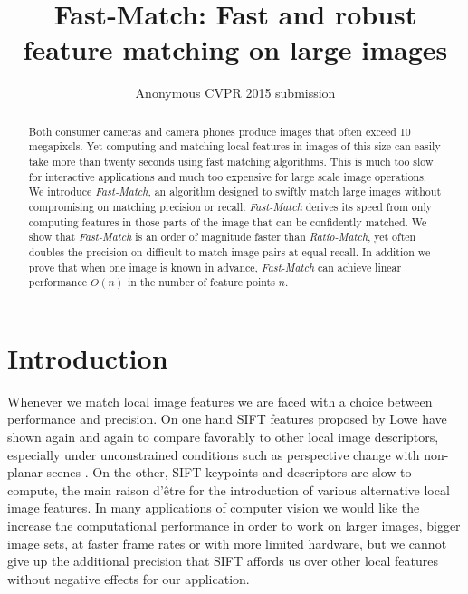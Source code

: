 \documentclass[10pt,twocolumn,letterpaper]{article}
\begin{document}
\ifcvprfinal\pagestyle{empty}\fi
\title{Fast-Match: Fast and robust feature matching on large images}

\author{Anonymous CVPR 2015 submission}

\maketitle

\begin{abstract}
    Both consumer cameras and camera phones produce images that often exceed 10 megapixels. Yet computing and matching local features in images of this size can easily take more than twenty seconds using fast matching algorithms. This is much too slow for interactive applications and much too expensive for large scale image operations. We introduce \emph{Fast-Match}, an algorithm designed to swiftly match large images without compromising on matching precision or recall. \emph{Fast-Match} derives its speed from only computing features in those parts of the image that can be confidently matched. We show that \emph{Fast-Match} is an order of magnitude faster than \emph{Ratio-Match}, yet often doubles the precision on difficult to match image pairs at equal recall. In addition we prove that when one image is known in advance, \emph{Fast-Match} can achieve linear performance $O(n)$ in the number of feature points $n$.
\end{abstract}

\section{Introduction}
%
Whenever we match local image features we are faced with a choice between performance and precision. On one hand SIFT features proposed by Lowe \cite{lowe2004sift} have shown again and again to compare favorably to other local image descriptors, especially under unconstrained conditions such as perspective change with non-planar scenes \cite{mikolajczyk2005performance,moreels2007evaluation,heinly2012comparative}. On the other, SIFT keypoints and descriptors are slow to compute, the main raison d'\^{e}tre for the introduction of various alternative local image features. In many applications of computer vision we would like the increase the computational performance in order to work on larger images, bigger image sets, at faster frame rates or with more limited hardware, but we cannot give up the additional precision that SIFT affords us over other local features without negative effects for our application.
\end{document}

